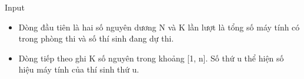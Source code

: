 Input  
\begin{itemize}
	\item     Dòng đầu tiên là hai số nguyên dương N và K lần lượt là tổng số máy tính có trong phòng thi và số thí sinh đang dự thi.   
	\item     Dòng tiếp theo ghi K số nguyên trong khoảng [1, n]. Số thứ u thể hiện số hiệu máy tính của thí sinh thứ u.   
\end{itemize}